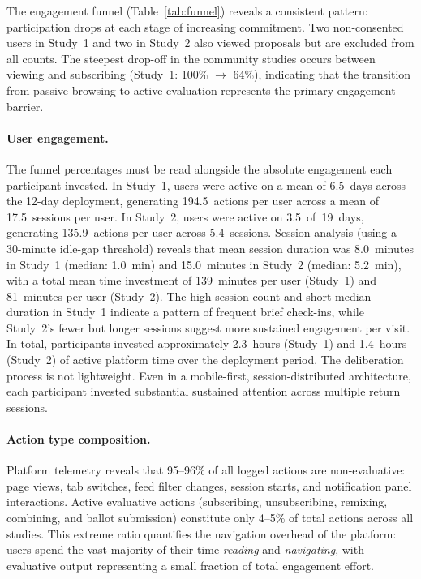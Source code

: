 \documentclass[a4paper, 12pt, twoside]{iviathesis}
\begin{document}
The engagement funnel (Table~\ref{tab:funnel}) reveals a consistent pattern: participation drops at each stage of increasing commitment. Two non-consented users in Study~1 and two in Study~2 also viewed proposals but are excluded from all counts. The steepest drop-off in the community studies occurs between viewing and subscribing (Study~1: 100\% $\to$ 64\%), indicating that the transition from passive browsing to active evaluation represents the primary engagement barrier.

\paragraph{User engagement.}
The funnel percentages must be read alongside the absolute engagement each participant invested. In Study~1, users were active on a mean of 6.5~days across the 12-day deployment, generating 194.5~actions per user across a mean of 17.5~sessions per user. In Study~2, users were active on 3.5~of~19~days, generating 135.9~actions per user across 5.4~sessions. Session analysis (using a 30-minute idle-gap threshold) reveals that mean session duration was 8.0~minutes in Study~1 (median: 1.0~min) and 15.0~minutes in Study~2 (median: 5.2~min), with a total mean time investment of 139~minutes per user (Study~1) and 81~minutes per user (Study~2). The high session count and short median duration in Study~1 indicate a pattern of frequent brief check-ins, while Study~2's fewer but longer sessions suggest more sustained engagement per visit. In total, participants invested approximately 2.3~hours (Study~1) and 1.4~hours (Study~2) of active platform time over the deployment period. The deliberation process is not lightweight. Even in a mobile-first, session-distributed architecture, each participant invested substantial sustained attention across multiple return sessions.

\paragraph{Action type composition.}
Platform telemetry reveals that 95--96\% of all logged actions are non-evaluative: page views, tab switches, feed filter changes, session starts, and notification panel interactions. Active evaluative actions (subscribing, unsubscribing, remixing, combining, and ballot submission) constitute only 4--5\% of total actions across all studies. This extreme ratio quantifies the navigation overhead of the platform: users spend the vast majority of their time \textit{reading} and \textit{navigating}, with evaluative output representing a small fraction of total engagement effort.
\end{document}
